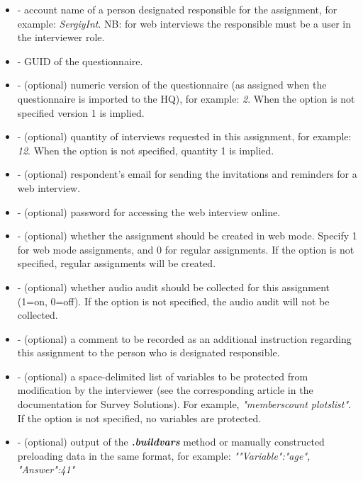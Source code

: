\optsheader
\begin{itemize}

\item {} - account name of a person designated responsible
for the assignment, for example: \textit{SergiyInt}. NB: for web interviews the
responsible must be a user in the interviewer role.

\item {} - GUID of the questionnaire.

\item {} - (optional) numeric version of the questionnaire
      (as assigned when the questionnaire is imported to the HQ), for example:
      \textit{2}. When the option is not specified version 1 is implied.

\item {} - (optional) quantity of interviews requested in
      this assignment, for example: \textit{12}. When the option is not
      specified, quantity 1 is implied.

\item {} - (optional) respondent's email for sending the
      invitations and reminders for a web interview.

\item {} - (optional) password for accessing the web interview
      online.

\item {} - (optional) whether the assignment should be
      created in web mode. Specify 1 for web mode assignments, and 0 for regular
      assignments. If the option is not specified, regular assignments will be
      created.

\item {} - (optional) whether audio audit should be collected for
      this assignment (1=on, 0=off). If the option is not specified, the audio
      audit will not be collected.

\item {} - (optional) a comment to be recorded as an additional
      instruction regarding this assignment to the person who is designated
      responsible.

\item {} - (optional) a space-delimited list of variables to
      be protected from modification by the interviewer (see the corresponding
      article in the documentation for Survey Solutions). For example,
      \textit{"memberscount plotslist"}. If the option is not specified, no
      variables are protected.

\item {} - (optional) output of the \textit{\textbf{.buildvars}}
      method or manually constructed preloading data in the same format, for
      example: \textit{"{"Variable":"age", "Answer":41}"}

\end{itemize}

